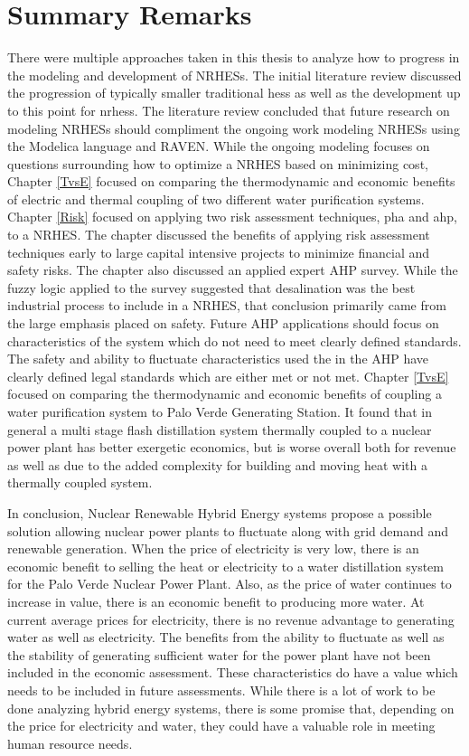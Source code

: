 \section{Summary Remarks}
 There were multiple approaches taken in this thesis to analyze how to progress in the modeling and development of NRHESs. The initial literature review discussed the progression of typically smaller traditional \ac{hes}s as well as the development up to this point for \ac{nrhes}s.  The literature review concluded that future research on modeling NRHESs should compliment the ongoing work modeling NRHESs using the Modelica language and RAVEN.  While the ongoing modeling focuses on questions surrounding how to optimize a NRHES based on minimizing cost, Chapter \ref{TvsE} focused on comparing the thermodynamic and economic benefits of electric and thermal coupling of two different water purification systems. Chapter \ref{Risk} focused on applying two risk assessment techniques, \ac{pha} and \ac{ahp}, to a NRHES.  The chapter discussed the benefits of applying risk assessment techniques early to large capital intensive projects to minimize financial and safety risks.  The chapter also discussed an applied expert AHP survey.  While the fuzzy logic applied to the survey suggested that desalination was the best industrial process to include in a NRHES, that conclusion primarily came from the large emphasis placed on safety.  Future AHP applications should focus on characteristics of the system which do not need to meet clearly defined standards.  The safety and ability to fluctuate characteristics used the in the AHP have clearly defined legal standards which are either met or not met.  Chapter \ref{TvsE} focused on comparing the thermodynamic and economic benefits of coupling a water purification system to Palo Verde Generating Station. It found that in general a multi stage flash distillation system thermally coupled to a nuclear power plant has better exergetic economics, but is worse overall both for revenue as well as due to the added complexity for building and moving heat with a thermally coupled system.

 In conclusion, Nuclear Renewable Hybrid Energy systems propose a possible solution allowing nuclear power plants to fluctuate along with grid demand and renewable generation.  When the price of electricity is very low, there is an economic benefit to selling the heat or electricity to a water distillation system for the Palo Verde Nuclear Power Plant. Also, as the price of water continues to increase in value, there is an economic benefit to producing more water. At current average prices for electricity, there is no revenue advantage to generating water as well as electricity.  The benefits from the ability to fluctuate as well as the stability of generating sufficient water for the power plant have not been included in the economic assessment. These characteristics do have a value which needs to be included in future assessments. While there is a lot of work to be done analyzing hybrid energy systems, there is some promise that, depending on the price for electricity and water, they could have a valuable role in meeting human resource needs.
